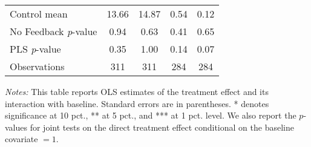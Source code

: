\begin{table}[ht]
{\begin{threeparttable}
\begin{tabular}{l*{4}{c}}
Control mean    &    13.66         &    14.87         &     0.54         &     0.12         \\
No Feedback \emph{p}-value&     0.94         &     0.63         &     0.41         &     0.65         \\
PLS \emph{p}-value&     0.35         &     1.00         &     0.14         &     0.07         \\
Observations    &      311         &      311         &      284         &      284         \\
\bottomrule \end{tabular} \begin{tablenotes}[flushleft] \footnotesize \item \emph{Notes:} This table reports OLS estimates of the treatment effect and its interaction with baseline. Standard errors are in parentheses. * denotes significance at 10 pct., ** at 5 pct., and *** at 1 pct. level. We also report the \(p\)-values for joint tests on the direct treatment effect conditional on the baseline covariate $= 1$. \end{tablenotes} \end{threeparttable} } \end{table}

